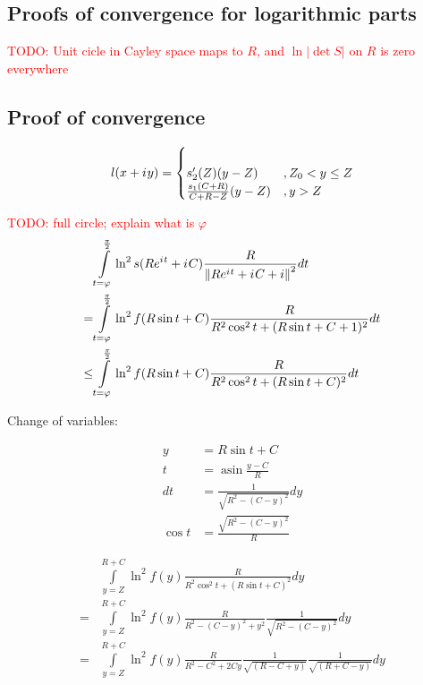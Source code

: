 \documentclass[12pt, a4paper]{article}
\newcommand{\abs}[1]{\left| #1 \right|}
\newcommand{\norm}[1]{\left\lVert #1 \right\rVert}
\newcommand{\eexp}[1]{e^{#1}}
\newcommand{\iu}{{i\mkern1mu}}
\renewcommand{\phi}{\varphi}
\newcommand{\todo}[1]{{\large \textcolor{red}{TODO: #1}}}
\DeclareMathOperator\asin{asin}
\begin{document}
\subsection*{Proofs of convergence for logarithmic parts}

\todo{Unit cicle in Cayley space maps to $R$, and $\ln\abs{\det S}$ on $R$ is zero everywhere}

\subsection*{Proof of convergence}

\[
l(x + \iu y) =
\begin{cases}
 \\
s_2'(Z)(y - Z)                       &, Z_0 < y \le Z \\
\frac{s_1(C + R)}{C + R - Z} (y - Z) &, y > Z
\end{cases}
\]


\todo{full circle; explain what is $\phi$}
\begin{align*}
    & \int\limits_{t = \phi}^{\frac{\pi}{2}} \ln^2 s(R \eexp{\iu t} + \iu C) \frac{R}{\norm{R \eexp{\iu t} + \iu C + i}^2} dt\\
=   & \int\limits_{t = \phi}^{\frac{\pi}{2}} \ln^2 f(R \sin t + C) \frac{R}{R^2 \cos^2 t + (R \sin t + C + 1)^2} dt\\
\le & \int\limits_{t = \phi}^{\frac{\pi}{2}} \ln^2 f(R \sin t + C) \frac{R}{R^2 \cos^2 t + (R \sin t + C)^2} dt\\
\end{align*}


Change of variables:

\begin{align*}
y &= R \sin t + C \\
t &= \asin \frac{y - C}{R} \\
dt &= \frac{1}{\sqrt{R^2 - (C - y)^2}} dy \\
\cos t &= \frac{\sqrt{R^2 - (C - y)^2}}{R}
\end{align*}


\begin{align*}
    & \int\limits_{y = Z}^{R + C} \ln^2 f(y) \frac{R}{R^2 \cos^2 t + (R \sin t + C)^2} dy \\
=   & \int\limits_{y = Z}^{R + C} \ln^2 f(y) \frac{R}{R^2 - (C - y)^2 + y^2} \frac{1}{\sqrt{R^2 - (C - y)^2}} dy\\
=   & \int\limits_{y = Z}^{R + C} \ln^2 f(y) \frac{R}{R^2 - C^2 + 2 C y} \frac{1}{\sqrt{(R - C + y)}} \frac{1}{\sqrt{(R + C - y)}} dy\\
\end{align*}
\end{document}
